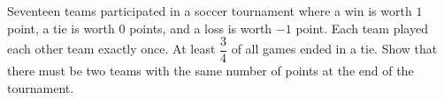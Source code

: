 Seventeen teams participated in a soccer tournament where a win is worth $1$ point, a tie is worth $0$ points, and a loss is worth $-1$ point. Each team played each other team exactly once. At least $\dfrac{3}{4}$ of all games ended in a tie. Show that there must be two teams with the same number of points at the end of the tournament.
